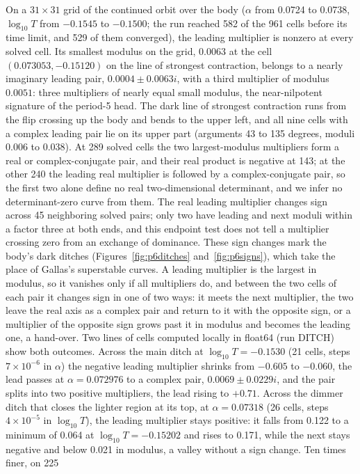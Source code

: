 \documentclass[11pt,letterpaper]{article}
\begin{document}
On a $31\times31$ grid of the continued orbit over the body ($\alpha$ from 0.0724 to 0.0738, $\log_{10}T$ from $-0.1545$
to $-0.1500$; the run reached 582 of the 961 cells before its time limit, and 529 of them converged), the leading multiplier is nonzero at every solved cell. Its smallest modulus on the grid,
$0.0063$ at the cell $(0.073053,-0.15120)$ on the line of strongest contraction, belongs to a nearly imaginary
leading pair, $0.0004\pm0.0063i$, with a third
multiplier of modulus $0.0051$: three multipliers of nearly equal small modulus, the near-nilpotent signature of the
period-5 head. The dark line of strongest contraction runs from the flip crossing up the body and bends to the upper
left, and all nine cells with a complex leading pair lie on its upper part (arguments 43 to 135 degrees, moduli 0.006
to 0.038). At 289 solved cells the two largest-modulus multipliers form a real or complex-conjugate pair, and their real product
is negative at 143; at the other 240 the leading real multiplier is followed by a complex-conjugate pair, so the first
two alone define no real two-dimensional determinant, and we infer no determinant-zero curve from them. The real
leading multiplier changes sign across 45 neighboring solved pairs; only two have leading and next moduli within a
factor three at both ends, and this endpoint test does not tell a multiplier crossing zero from an exchange of
dominance. These sign changes mark the body's dark ditches (Figures~\ref{fig:p6ditches} and~\ref{fig:p6signs}), which take the place of Gallas's
superstable curves. A leading
multiplier is the largest in modulus, so it vanishes only if all multipliers do, and between the two cells of each pair it changes sign in one of two ways: it meets the next multiplier, the two leave
the real axis as a complex pair and return to it with the opposite sign, or a multiplier of the opposite sign grows
past it in modulus and becomes the leading one, a hand-over. Two lines of cells computed locally in float64
(run DITCH) show both outcomes. Across the main ditch at $\log_{10}T=-0.1530$ (21 cells, steps $7\times10^{-6}$ in
$\alpha$) the negative leading multiplier shrinks from $-0.605$ to $-0.060$, the lead passes at $\alpha=0.072976$ to a
complex pair, $0.0069\pm0.0229i$, and the pair splits into two positive multipliers, the lead rising to $+0.71$. Across
the dimmer ditch that closes the lighter region at its top, at $\alpha=0.07318$ (26 cells, steps $4\times10^{-5}$ in
$\log_{10}T$), the leading multiplier stays positive: it falls from 0.122 to a minimum of 0.064 at
$\log_{10}T=-0.15202$ and rises to 0.171, while the next stays negative and below 0.021 in modulus, a valley without a sign change. Ten times finer, on 225
\end{document}

